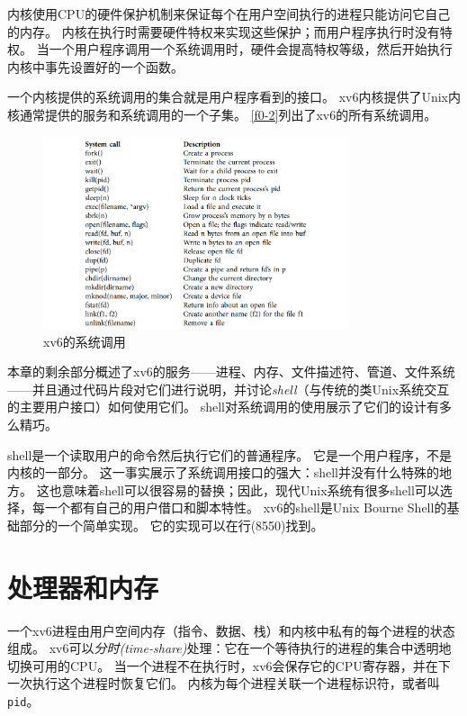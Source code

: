 内核使用CPU的硬件保护机制来保证每个在用户空间执行的进程只能访问它自己的内存。
内核在执行时需要硬件特权来实现这些保护；而用户程序执行时没有特权。
当一个用户程序调用一个系统调用时，硬件会提高特权等级，然后开始执行内核中事先设置好的一个函数。

一个内核提供的系统调用的集合就是用户程序看到的接口。
xv6内核提供了Unix内核通常提供的服务和系统调用的一个子集。
\autoref{f0-2}列出了xv6的所有系统调用。

\begin{figure}[htbp]
    \centering
    \includegraphics[width=0.8\textwidth]{../imgs/f0-2.png}
    \caption{xv6的系统调用}
    \label{f0-2}
\end{figure}

本章的剩余部分概述了xv6的服务——进程、内存、文件描述符、管道、文件系统——并且通过代码片段对它们进行说明，并讨论\emph{shell}（与传统的类Unix系统交互的主要用户接口）如何使用它们。
shell对系统调用的使用展示了它们的设计有多么精巧。

shell是一个读取用户的命令然后执行它们的普通程序。
它是一个用户程序，不是内核的一部分。
这一事实展示了系统调用接口的强大：shell并没有什么特殊的地方。
这也意味着shell可以很容易的替换；因此，现代Unix系统有很多shell可以选择，每一个都有自己的用户借口和脚本特性。
xv6的shell是Unix Bourne Shell的基础部分的一个简单实现。
它的实现可以在行(8550)找到。

\section*{处理器和内存}

一个xv6进程由用户空间内存（指令、数据、栈）和内核中私有的每个进程的状态组成。
xv6可以\emph{分时(time-share)}处理：它在一个等待执行的进程的集合中透明地切换可用的CPU。
当一个进程不在执行时，xv6会保存它的CPU寄存器，并在下一次执行这个进程时恢复它们。
内核为每个进程关联一个进程标识符，或者叫\texttt{pid}。

